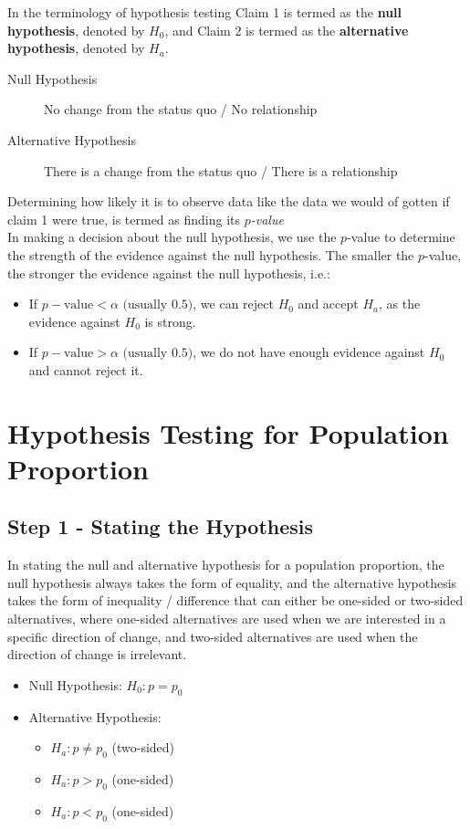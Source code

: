 \documentclass[12pt letter]{report}
\begin{document}
In the terminology of hypothesis testing Claim 1 is termed as the \textbf{null hypothesis}, denoted by $H_0$, and Claim
2 is termed as the \textbf{alternative hypothesis}, denoted by $H_a$.

\begin{description}
  \item[Null Hypothesis] No change from the status quo / No relationship
  \item[Alternative Hypothesis] There is a change from the status quo / There is a relationship
\end{description}

Determining how likely it is to observe data like the data we would of gotten if claim 1 were true, is termed as
finding its \textit{$p$-value} \\

In making a decision about the null hypothesis, we use the $p$-value to determine the strength of the evidence against
the null hypothesis. The smaller the $p$-value, the stronger the evidence against the null hypothesis, i.e.:
\begin{itemize}
  \item If $p-\text{value} < \alpha \text{ (usually $0.5$)}$, we can reject $H_0$ and accept $H_{a}$, as the evidence
        against $H_0$ is strong.
  \item If $p-\text{value} > \alpha \text{ (usually $0.5$)}$, we do not have enough evidence against $H_0$ and cannot reject it.
\end{itemize}

\section{Hypothesis Testing for Population Proportion}

\subsection{Step 1 - Stating the Hypothesis}

In stating the null and alternative hypothesis for a population proportion, the null hypothesis always takes the form of
equality, and the alternative hypothesis takes the form of inequality / difference that can either be one-sided or
two-sided alternatives, where one-sided alternatives are used when we are interested in a specific direction of change,
and two-sided alternatives are used when the direction of change is irrelevant.
\begin{itemize}
  \item Null Hypothesis: $H_0: p = p_0$
  \item Alternative Hypothesis:
        \begin{itemize}
          \item $H_a: p \neq p_0$ (two-sided)
          \item $H_a: p > p_0$ (one-sided)
          \item $H_a: p < p_0$ (one-sided)
        \end{itemize}
\end{itemize}
\end{document}
